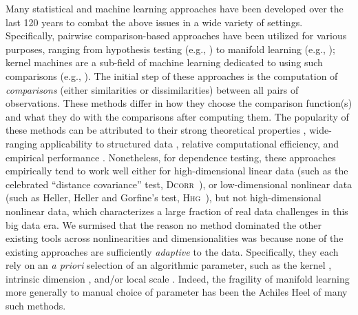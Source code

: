 \documentclass[11pt]{article}
\providecommand{\sct}[1]{{\normalfont\textsc{#1}}}
\newcommand{\Hhg}{\sct{Hhg}}
\newcommand{\Dcorr}{\sct{Dcorr}}
\begin{document}
Many statistical and machine learning approaches have been developed over the last 120 years to combat the above issues in a wide variety of  settings. Specifically, pairwise comparison-based approaches have been utilized  for various purposes, ranging from hypothesis testing (e.g., \cite{David1966,Mantel1967,Friedman1983,Schilling1986,Maa1996,SzekelyRizzo2009,SzekelyRizzo2013b,HellerGorfine2013,Dumcke2014}) 
to manifold learning (e.g., \cite{TorgersonBook, TenenbaumSilvaLangford2000, SaulRoweis2000, BelkinNiyogi2003,DiffusionPNAS, MMS:NoisyDictionaryLearning}); kernel machines are a sub-field of machine learning dedicated to using such comparisons (e.g., \cite{scholkopf2002learning,GrettonEtAl2005,harchaoui2013kernel}).
The initial step of these approaches is the computation of \emph{comparisons} (either  similarities or dissimilarities) between all pairs of observations.
These methods differ in how they choose the comparison function(s) and what they do with the comparisons after computing them. 
The popularity of these methods can be attributed to their strong theoretical properties \cite{SilvaTenenbaum2002,Allard2012}, wide-ranging applicability to structured data \cite{scholkopf2002learning}, relative computational efficiency, and empirical performance \cite{lu2014scale}.
Nonetheless, for dependence testing, these approaches empirically tend to work well either for high-dimensional linear data (such as the celebrated ``distance covariance'' test,  \Dcorr~\cite{SzekelyRizzo2013a}), or low-dimensional nonlinear data (such as Heller, Heller and Gorfine's test, \Hhg~\cite{heller2016consistent}), but not high-dimensional nonlinear data, which characterizes a large fraction of real data challenges in this big data era. 
We surmised that the reason no method dominated the other existing tools across nonlinearities and dimensionalities was because none of the existing approaches are sufficiently \emph{adaptive} to the data.  Specifically, they each rely on an \emph{a priori} selection of an algorithmic parameter, such as the kernel  \cite{scholkopf2002learning}, intrinsic dimension \cite{RoweisSaul2003}, and/or local scale \cite{Allard2012}. Indeed, the fragility of manifold learning more generally to manual choice of parameter has been the Achiles Heel of many such methods.

\end{document}
